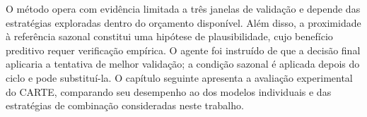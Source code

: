 O método opera com evidência limitada a três janelas de validação e depende das estratégias exploradas dentro do orçamento disponível. Além disso, a proximidade à referência sazonal constitui uma hipótese de plausibilidade, cujo benefício preditivo requer verificação empírica. O agente foi instruído de que a decisão final aplicaria a tentativa de melhor validação; a condição sazonal é aplicada depois do ciclo e pode substituí-la. O capítulo seguinte apresenta a avaliação experimental do CARTE, comparando seu desempenho ao dos modelos individuais e das estratégias de combinação consideradas neste trabalho.
